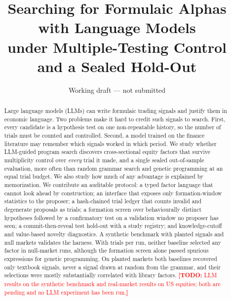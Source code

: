 \documentclass[11pt]{article}
\title{Searching for Formulaic Alphas with Language Models\\
under Multiple-Testing Control and a Sealed Hold-Out}
\author{\todo{author names and affiliations}}
\date{Working draft --- not submitted}
\newcommand{\todo}[1]{\textcolor{red}{\textbf{[TODO:} #1\textbf{]}}}
\begin{document}
\maketitle

\begin{abstract}
Large language models (LLMs) can write formulaic trading signals and justify
them in economic language. Two problems make it hard to credit such signals to
search. First, every candidate is a hypothesis test on one non-repeatable
history, so the number of trials must be counted and controlled. Second, a
model trained on the finance literature may remember which signals worked in
which period. We study whether LLM-guided program search discovers
cross-sectional equity factors that survive multiplicity control over
\emph{every} trial it made, and a single sealed out-of-sample evaluation, more
often than random grammar search and genetic programming at an equal trial
budget. We also study how much of any advantage is explained by memorization.
We contribute an auditable protocol: a typed factor language that cannot look
ahead by construction; an interface that exposes only formation-window
statistics to the proposer; a hash-chained trial ledger that counts invalid
and degenerate proposals as trials; a formation screen over behaviourally
distinct hypotheses followed by a confirmatory test on a validation window no
proposer has seen; a commit-then-reveal test hold-out with a study registry;
and knowledge-cutoff and value-based novelty diagnostics. A synthetic
benchmark with planted signals and null markets validates the harness. With
\SynBudget{} trials per run, neither baseline selected any factor in
\SynNullRuns{} null-market runs, although the formation screen alone passed
spurious expressions for genetic programming. On planted markets both
baselines recovered only textbook signals, never a signal drawn at random
from the grammar, and their selections were mostly substantially correlated
with library factors. \todo{LLM results on the synthetic benchmark and
real-market results on US equities; both are pending and no LLM experiment
has been run.}
\end{abstract}











\end{document}
